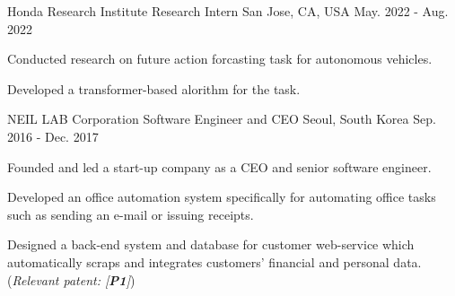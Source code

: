 


\begin{cventries}

\cventry
{Honda Research Institute} %
{Research Intern} %
{San Jose, CA, USA} %
{May. 2022 - Aug. 2022} %
{ %
\begin{cvitems}
\item {Conducted research on future action forcasting task for autonomous vehicles.}
\item {Developed a transformer-based alorithm for the task.}
\end{cvitems}
}


\cventry
{NEIL LAB Corporation} %
{Software Engineer and CEO} %
{Seoul, South Korea} %
{Sep. 2016 - Dec. 2017} %
{ %
\begin{cvitems}
\item {Founded and led a start-up company as a CEO and senior software engineer.}
\item {Developed an office automation system specifically for automating office tasks such as sending an e-mail or issuing receipts.}
\item {Designed a back-end system and database for customer web-service which automatically scraps and integrates customers' financial and personal data. (\textit{Relevant patent: [\textbf{P1}]})}
\end{cvitems}
}



\end{cventries}
